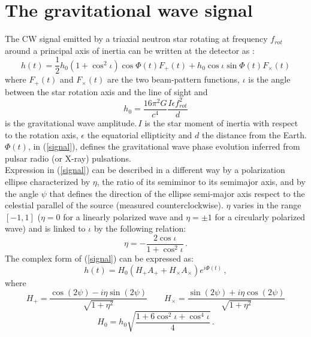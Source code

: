 \documentclass[11pt,a4paper,final]{iopart}
\begin{document}
\section{The gravitational wave signal}\label{due}
The CW signal emitted by a triaxial neutron star rotating at frequency $f_{rot}$ around a principal axis of inertia can be written at the detector as \cite{JKS}:
\begin{equation}\label{signal}
h(t)= \frac{1}{2}h_0 (1+\cos^2 \iota) \cos\Phi(t) F_+(t) + h_0 \cos \iota \sin \Phi(t) F_\times(t)
\end{equation}where  $F_+(t)$ and $F_\times(t)$ are the two  beam-pattern  functions, $\iota$ is the angle between the star rotation axis and the line of sight and
\begin{equation}\label{amplitude}
h_0=\frac{16\pi^2 G}{c^4} \frac{I\epsilon f_{rot}^2}{d}
\end{equation} is the gravitational wave amplitude.$\,I$ is the star moment of inertia with respect to the rotation axis, $\epsilon$ the equatorial ellipticity and $d$  the distance from the Earth. 
\\$\Phi(t)$, in  (\ref{signal}), defines the gravitational wave phase evolution inferred from pulsar radio (or X-ray) pulsations.
\\Expression in (\ref{signal}) can be described in a different way by a polarization ellipse characterized by $\eta$, the ratio of its semiminor to its semimajor axis, and by the angle $\psi$ that defines the direction of the ellipse semi-major axis respect to the celestial parallel of the source (measured counterclockwise). $\eta$ varies in the range $[-1,1]$ ($\eta=0$ for a linearly polarized wave and $\eta=\pm1$ for a circularly polarized wave) and is linked to $\iota$ by the following relation:\begin{equation}
\eta=-\frac{2\cos \iota}{1+\cos^2 \iota}\,.
\end{equation} 
The complex form of (\ref{signal}) can be expressed as:\begin{equation}
h(t)=H_0(H_+ A_+ + H_\times A_\times)e^{i\Phi(t)} \,,
\end{equation}where\begin{equation}
H_+=\frac{\cos(2\psi)-i\eta \sin(2\psi)}{\sqrt{1+\eta^2}} \qquad    H_\times=\frac{\sin(2\psi)+i\eta \cos(2\psi)}{\sqrt{1+\eta^2}}
\end{equation}
\begin{equation}\label{corramp}
 H_0=h_0 \sqrt{\frac{1+6\cos^2\iota + \cos^4 \iota}{4}}\,.
\end{equation}
\end{document}
